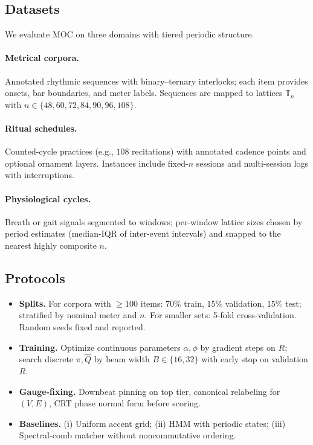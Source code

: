 \documentclass[12pt]{article}
\numberwithin{equation}{section}
\theoremstyle{plain}
\theoremstyle{definition}
\theoremstyle{remark}
\begin{document}
\subsection*{Datasets}
We evaluate MOC on three domains with tiered periodic structure.

\paragraph{Metrical corpora.}
Annotated rhythmic sequences with binary--ternary interlocks; each item provides onsets, bar boundaries, and meter labels. Sequences are mapped to lattices $\mathbb{T}_n$ with $n\in\{48,60,72,84,90,96,108\}$.

\paragraph{Ritual schedules.}
Counted-cycle practices (e.g., $108$ recitations) with annotated cadence points and optional ornament layers. Instances include fixed-$n$ sessions and multi-session logs with interruptions.

\paragraph{Physiological cycles.}
Breath or gait signals segmented to windows; per-window lattice sizes chosen by period estimates (median-IQR of inter-event intervals) and snapped to the nearest highly composite $n$.

\subsection*{Protocols}
\begin{itemize}
  \item \textbf{Splits.} For corpora with $\ge 100$ items: $70\%$ train, $15\%$ validation, $15\%$ test; stratified by nominal meter and $n$. For smaller sets: 5-fold cross-validation. Random seeds fixed and reported.
  \item \textbf{Training.} Optimize continuous parameters $\alpha,\phi$ by gradient steps on $R$; search discrete $\pi,\hat{Q}$ by beam width $B\in\{16,32\}$ with early stop on validation $R$.
  \item \textbf{Gauge-fixing.} Downbeat pinning on top tier, canonical relabeling for $(V,E)$, CRT phase normal form before scoring.
  \item \textbf{Baselines.} (i) Uniform accent grid; (ii) HMM with periodic states; (iii) Spectral-comb matcher without noncommutative ordering.
\end{itemize}
\end{document}
